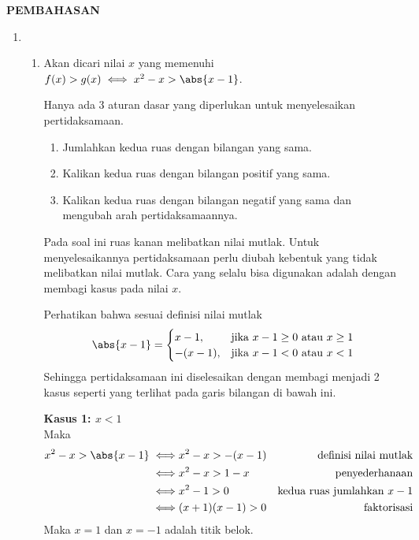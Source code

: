 \begin{center}
    \textbf{\large{PEMBAHASAN}}
\end{center}
\begin{enumerate}[leftmargin=*, label={\arabic*}.]
\item
\begin{enumerate}[label={\alph*}.]
\item Akan dicari nilai $x$ yang memenuhi
$f(x) > g(x) \iff x^{2}-x > \abs{x-1}$.

\vspace{0.1cm}
Hanya ada 3 aturan dasar yang diperlukan untuk menyelesaikan pertidaksamaan.
\begin{enumerate}[label={\arabic*})]
    \item Jumlahkan kedua ruas dengan bilangan yang sama.
    \item Kalikan kedua ruas dengan bilangan positif yang sama.
    \item Kalikan kedua ruas dengan bilangan negatif yang sama dan 
    mengubah arah pertidaksamaannya.
\end{enumerate}
Pada soal ini ruas kanan melibatkan nilai mutlak. Untuk menyelesaikannya 
pertidaksamaan perlu diubah kebentuk yang tidak melibatkan nilai mutlak. Cara yang 
selalu bisa digunakan adalah dengan membagi kasus pada nilai $x$.
    
Perhatikan bahwa sesuai definisi nilai mutlak
\[
\abs{x-1} = 
\begin{cases}
    x-1, &\text{jika $x-1 \geq 0$ atau $x \geq 1$}\\
    -(x-1), &\text{jika $x-1 < 0$ atau $x < 1$}
\end{cases}
\]
Sehingga pertidaksamaan ini diselesaikan dengan membagi menjadi 2 kasus 
seperti yang terlihat pada garis bilangan di bawah ini.
    
\vspace{0.2cm}
    
\textbf{Kasus 1: $x < 1$}\\
Maka
\begin{align*}
    x^{2}-x > \abs{x-1}
    \iff &x^{2}-x > -(x-1)
    &\text{definisi nilai mutlak} \\
    \iff &x^{2}-x > 1-x
    &\text{penyederhanaan}\\
    \iff &x^{2} - 1 > 0
    &\text{kedua ruas jumlahkan $x-1$}\\
    \iff &(x+1)(x-1) > 0
    &\text{faktorisasi}
\end{align*}
Maka $x=1$ dan $x=-1$ adalah titik belok.


\end{enumerate}
\end{enumerate}
